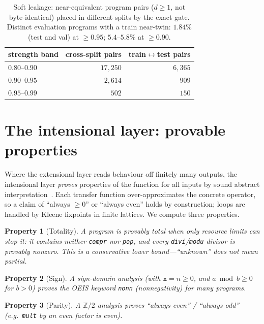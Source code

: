 \documentclass[11pt]{article}
\newcommand{\code}[1]{\texttt{#1}}
\newtheorem{property}{Property}
\begin{document}
\begin{table}[t]
\centering
\begin{tabular}{@{}lrr@{}}
\toprule
strength band & cross-split pairs & train$\leftrightarrow$test pairs \\
\midrule
$0.80$--$0.90$ & $17{,}250$ & $6{,}365$ \\
$0.90$--$0.95$ & $2{,}614$  & $909$ \\
$0.95$--$0.99$ & $502$      & $150$ \\
\bottomrule
\end{tabular}
\caption{Soft leakage: near-equivalent program pairs ($d\ge 1$, not byte-identical) placed
in different splits by the exact gate. Distinct evaluation programs with a train near-twin:
$1.84\%$ (test and val) at $\ge 0.95$; $5.4$--$5.8\%$ at $\ge 0.90$.}
\label{tab:leak}
\end{table}

\section{The intensional layer: provable properties}
\label{sec:intensional}

Where the extensional layer reads behaviour off finitely many outputs, the intensional
layer \emph{proves} properties of the function for all inputs by sound abstract
interpretation~\cite{cousot1977}. Each transfer function over-approximates the concrete
operator, so a claim of ``always $\ge 0$'' or ``always even'' holds by construction; loops
are handled by Kleene fixpoints in finite lattices. We compute three properties.

\begin{property}[Totality]
A program is \emph{provably total} when only resource limits can stop it: it contains
neither \code{compr} nor \code{pop}, and every \code{divi}/\code{modu} divisor is provably
nonzero. This is a conservative lower bound---``unknown'' does not mean partial.
\end{property}
\begin{property}[Sign]
A sign-domain analysis (with $\code{x}=n\ge 0$, and $a\bmod b\ge 0$ for $b>0$) proves the
OEIS keyword \code{nonn} (nonnegativity) for many programs.
\end{property}
\begin{property}[Parity]
A $\mathbb{Z}/2$ analysis proves ``always even'' / ``always odd'' (e.g.\ \code{mult} by an
even factor is even).
\end{property}
\end{document}
